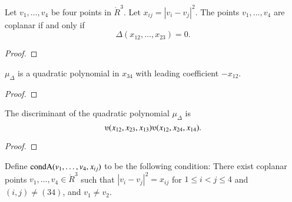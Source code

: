 \begin{tarskidata}
\begin{tarski}
\begin{lemma}
Let $v_1,\ldots,v_4$ be four points
in $\ring{R}^3$.  Let $x_{ij} = |v_i-v_j|^2$.
The points $v_1,\ldots,v_4$ are coplanar if and only if
	$$\Delta(x_{12},\ldots,x_{23}) = 0.$$
\end{lemma}

\begin{proof}
\end{proof}
\end{tarski}





\begin{tarski}

\begin{lemma} 
$\mu_\Delta$  is a quadratic
polynomial in $x_{34}$ with leading coefficient $-x_{12}$. 
\end{lemma}

\begin{proof}
\end{proof}
\end{tarski}



\begin{tarski}

\begin{lemma}
The discriminant of the quadratic polynomial $\mu_\Delta$ is
	$$
	\ups(x_{12},x_{23},x_{13}) \ups(x_{12},x_{24},x_{14}).
	$$
\end{lemma}

\begin{proof}
\end{proof}
\end{tarski}




\begin{tarski}

\begin{definition}
Define ${\operatorname{condA}}(v_1,\ldots,v_4,x_{ij})$ to be the following condition:
There exist
coplanar points $v_1,\ldots,v_4\in\ring{R}^3$ such that $|v_i-v_j|^2 = x_{ij}$ for $1\le i < j \le 4$ and $(i,j)\ne (34)$, and $v_1\ne v_2$.
\end{definition}
\end{tarski}



\end{tarskidata}
